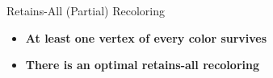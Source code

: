 \begin{frame}{Retains-All (Partial) Recoloring}

\begin{itemize}

\item \textbf<1>
{At least one vertex of every color survives}

\item \textbf<2>
{There is an optimal retains-all recoloring}

\end{itemize}



\end{frame}
